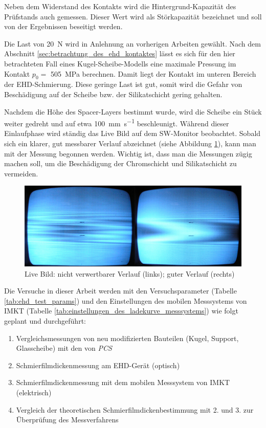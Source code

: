 Neben dem Widerstand des Kontakts wird die Hintergrund-Kapazität des Prüfstands auch gemessen.
Dieser Wert wird als Störkapazität bezeichnet und soll von der Ergebnissen beseitigt werden.

Die Last von \SI{20}{\newton} wird in Anlehnung an vorherigen Arbeiten gewählt.
Nach dem Abschnitt \ref{sec:betrachtung_des_ehd_kontaktes} lässt es sich für den hier betrachteten Fall eines Kugel-Scheibe-Modells eine maximale Pressung im Kontakt $p_0 =$ \SI{505}{\mega\pascal} berechnen.
Damit liegt der Kontakt im unteren Bereich der EHD-Schmierung.
Diese geringe Last ist gut, somit wird die Gefahr von Beschädigung auf der Scheibe bzw. der Silikatschicht gering gehalten.

Nachdem die Höhe des Spacer-Layers bestimmt wurde, wird die Scheibe ein Stück weiter gedreht und auf etwa \SI[per-mode=symbol]{100}{\mm\per\second} beschleunigt.
Während dieser Einlaufphase wird ständig das Live Bild auf dem SW-Monitor beobachtet.
Sobald sich ein klarer, gut messbarer Verlauf abzeichnet (siehe Abbildung \ref{fig:ehd_live_bild}), kann man mit der Messung begonnen werden.
Wichtig ist, dass man die Messungen zügig machen soll, um die Beschädigung der Chromschicht und Silikatschicht zu vermeiden.
\begin{figure}[htb]
    \centering
    \includegraphics[width=0.8\linewidth]{./images/ehd_live_bild.jpg}
    \caption{Live Bild: nicht verwertbarer Verlauf (links); guter Verlauf (rechts)}
    \label{fig:ehd_live_bild}
\end{figure}

Die Versuche in dieser Arbeit werden mit den Versuchsparameter (Tabelle \ref{tab:ehd_test_params}) und den Einstellungen des mobilen Messsystems von IMKT (Tabelle \ref{tab:einstellungen_des_ladekurve_messsystems}) wie folgt geplant und durchgeführt:
\begin{enumerate}
    \item Vergleichsmessungen von neu modifizierten Bauteilen (Kugel, Support, Glasscheibe) mit den von \textit{PCS}
    \item Schmierfilmdickenmessung am EHD-Gerät (optisch)
    \item Schmierfilmdickenmessung mit dem mobilen Messsystem von IMKT (elektrisch)
    \item Vergleich der theoretischen Schmierfilmdickenbestimmung mit 2. und 3. zur Überprüfung des Messverfahrens
\end{enumerate}

